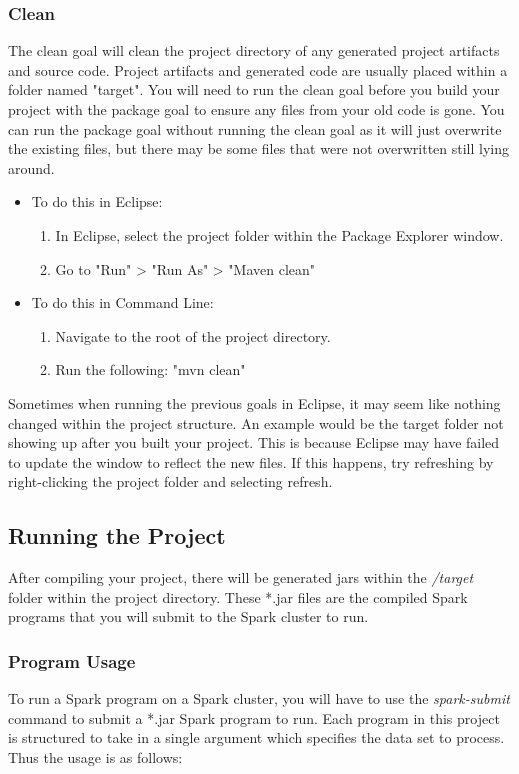 \documentclass{article}
\begin{document}
\subsubsection*{Clean}
The clean goal will clean the project directory of any generated project artifacts and source code. Project artifacts and generated code are usually placed within a folder named "target". You will need to run the clean goal before you build your project with the package goal to ensure any files from your old code is gone. You can run the package goal without running the clean goal as it will just overwrite the existing files, but there may be some files that were not overwritten still lying around.
\begin{itemize}
\item To do this in Eclipse:
	\begin{enumerate}
	\item In Eclipse, select the project folder within the Package Explorer window.
	\item Go to "Run" > "Run As" > "Maven clean"
	\end{enumerate}
\item To do this in Command Line:
	\begin{enumerate}
	\item Navigate to the root of the project directory.
	\item Run the following: "mvn clean"
	\end{enumerate}
\end{itemize}
\begin{info}[Note:]
Sometimes when running the previous goals in Eclipse, it may seem like nothing changed within the project structure. An example would be the target folder not showing up after you built your project. This is because Eclipse may have failed to update the window to reflect the new files. If this happens, try refreshing by right-clicking the project folder and selecting refresh. 
\end{info}


\subsection{Running the Project}
After compiling your project, there will be generated jars within the \textit{/target} folder within the project directory. These *.jar files are the compiled Spark programs that you will submit to the Spark cluster to run. 

\subsubsection*{Program Usage}
To run a Spark program on a Spark cluster, you will have to use the \textit{spark-submit} command to submit a *.jar Spark program to run. Each program in this project is structured to take in a single argument which specifies the data set to process. Thus the usage is as follows:
\end{document}
